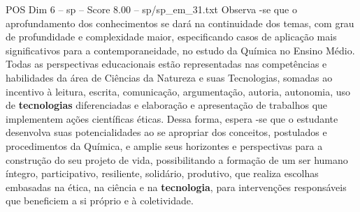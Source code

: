 \begin{textsample}{POS Dim 6 – sp – Score 8.00 – sp/sp\_em\_31.txt}
Observa -se que o aprofundamento dos conhecimentos se dará na continuidade dos temas, com grau de profundidade e complexidade maior, especificando casos de aplicação mais significativos para a contemporaneidade, no estudo da Química no Ensino Médio.
Todas as perspectivas educacionais estão representadas nas competências e habilidades da área de Ciências da Natureza e suas Tecnologias, somadas ao incentivo à leitura, escrita, comunicação, argumentação, autoria, autonomia, uso de \textbf{tecnologias} diferenciadas e elaboração e apresentação de trabalhos que implementem ações científicas éticas.
Dessa forma, espera -se que o estudante desenvolva suas potencialidades ao se apropriar dos conceitos, postulados e procedimentos da Química, e amplie seus horizontes e perspectivas para a construção do seu projeto de vida, possibilitando a formação de um ser humano íntegro, participativo, resiliente, solidário, produtivo, que realiza escolhas embasadas na ética, na ciência e na \textbf{tecnologia}, para intervenções responsáveis que beneficiem a si próprio e à coletividade.

\end{textsample}
